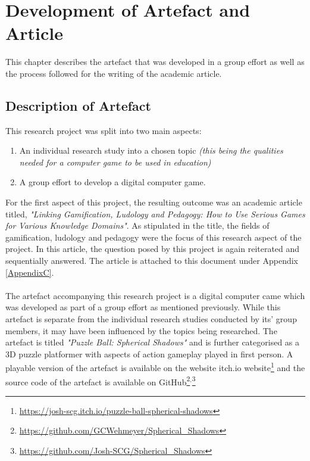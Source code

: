 
\chapter{Development of Artefact and Article} %

\label{Chapter3} %

This chapter describes the artefact that was developed in a group effort as well as the process followed for the writing of the academic article.

\section{Description of Artefact}
This research project was split into two main aspects: 
\begin{enumerate}
\item An individual research study into a chosen topic \textit{(this being the qualities needed for a computer game to be used in education)}
\item A group effort to develop a digital computer game.
\end{enumerate}

\noindent For the first aspect of this project, the resulting outcome was an academic article titled, \textit{"Linking Gamification, Ludology and Pedagogy: How to Use Serious Games for Various Knowledge Domains"}. As stipulated in the title, the fields of gamification, ludology and pedagogy were the focus of this research aspect of the project. In this article, the question posed by this project is again reiterated and sequentially answered. The article is attached to this document under Appendix  \ref{AppendixC}. 
\\\\
The artefact accompanying this research project is a digital computer came which was developed as part of a group effort as mentioned previously. While this artefact is separate from the individual research studies conducted by its' group members, it may have been influenced by the topics being researched. The artefact is titled \textit{"Puzzle Ball: Spherical Shadows"} and is further categorised as a 3D puzzle platformer with aspects of action gameplay played in first person. A playable version of the artefact is available on the website itch.io website\footnote{\url{https://josh-scg.itch.io/puzzle-ball-spherical-shadows}} and the source code of the artefact is available on GitHub\footnote{\url{https://github.com/GCWehmeyer/Spherical_Shadows}}$^{,}$\footnote{\url{https://github.com/Josh-SCG/Spherical_Shadows}}

